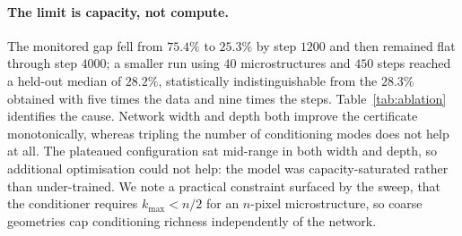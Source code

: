 \paragraph{The limit is capacity, not compute.} The monitored gap fell from
$75.4\%$ to $25.3\%$ by step $1200$ and then remained flat through step
$4000$; a smaller run using $40$ microstructures and $450$ steps reached a
held-out median of $28.2\%$, statistically indistinguishable from the
$28.3\%$ obtained with five times the data and nine times the steps.
Table~\ref{tab:ablation} identifies the cause. Network width and depth both
improve the certificate monotonically, whereas tripling the number of
conditioning modes does not help at all. The plateaued configuration sat
mid-range in both width and depth, so additional optimisation could not
help: the model was capacity-saturated rather than under-trained. We note a
practical constraint surfaced by the sweep, that the conditioner
requires $k_{\max} < n/2$ for an $n$-pixel microstructure, so coarse
geometries cap conditioning richness independently of the network.

\begin{table}[t]
\centering
\caption{Architecture ablation at fixed budget (elasticity, 14
microstructures, $150$ steps). Width and depth help; conditioner richness,
tested separately on $16$-pixel geometries where higher modes are
representable, does not.}
\label{tab:ablation}
\end{table}

